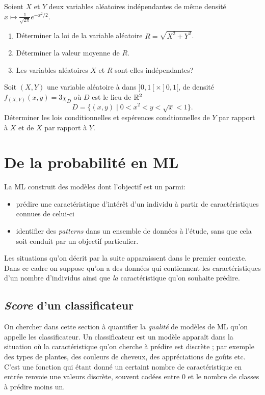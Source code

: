 \documentclass[11pt, a4paper]{article}
\begin{document}
\begin{question}
  Soient $X$ et $Y$ deux variables aléatoires indépendantes de même
  densité $x \mapsto \frac{1}{\sqrt{2\pi}}e^{-x^2/2}$.
  \begin{enumerate}
  \item Déterminer la loi de la variable aléatoire $R = \sqrt{X^2+Y^2}$.
  \item Déterminer la valeur moyenne de $R$.
  \item Les variables aléatoires $X$ et $R$ sont-elles indépendantes?
  \end{enumerate}
\end{question}

\begin{question}
  Soit $(X, Y)$ une variable aléatoire à dans $]0, 1[\times ]0, 1[$,
  de densité $f_{(X, Y)}(x, y) = 3\chi_D$ où $D$ est le lieu de $\mathbb{R}^2$
  \[
  D = \big\{(x, y) \mid 0 < x^2 < y < \sqrt{x} < 1\big\}.
  \]
  Déterminer les lois conditionnelles et espérences condtionnelles de
  $Y$ par rapport à $X$ et de $X$ par rapport à $Y$.
\end{question}

\section{De la probabilité en ML}
\label{sec:ML}

\noindent La ML construit des modèles dont l'objectif est un parmi:
\begin{itemize}
\item[\textbullet] prédire une caractéristique d'intérêt d'un individu à partir de
  caractéristiques connues de celui-ci
\item[\textbullet] identifier des \emph{patterns} dans un ensemble de données à
  l'étude, sans que cela soit conduit par un objectif particulier.
\end{itemize}
Les situations qu'on décrit par la suite apparaissent dans le premier
contexte. Dans ce cadre on suppose qu'on a des données qui contiennent
les caractéristiques d'un nombre d'individus ainsi que \emph{la}
caractéristique qu'on souhaite prédire.

\subsection{\emph{Score} d'un classificateur}
\label{sec:classificateurAlea}

On chercher dans cette section à quantifier la \textit{qualité} de
modèles de ML qu'on appelle les classificateur. Un classificateur est
un modèle apparaît dans la situation où la caractéristique qu'on
cherche à prédire est discrète ; par exemple des types de plantes, des
couleurs de cheveux, des appréciations de goûts etc. C'est une
fonction qui étant donné un certaint nombre de caractéristique en
entrée renvoie une valeurs discrète, souvent codées entre $0$ et le
nombre de classes à prédire moins un.
\end{document}
